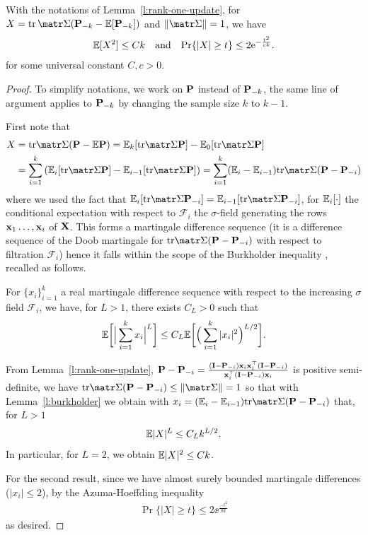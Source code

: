 \documentclass[../../thesis.tex]{subfiles}
\begin{document}
\begin{lemma}\label{l:trace}
  With the notations of Lemma~\ref{l:rank-one-update}, for $X=\tr\,\Sigmab(\P_{-k}-\E[\P_{-k}])$
  and $\|\Sigmab\| = 1$, we have
  \begin{align*}
    \E[X^2]\leq
    Ck\quad\text{and}\quad\Pr\{|X|\geq t\}\leq 2 \ee^{-\frac{t^2}{ck}}.
  \end{align*}
  for some universal constant $C,c > 0$.
\end{lemma}
\begin{proof}
  To simplify notations, we work on $\P$ instead of $\P_{-k}$, the same line of argument applies to $\P_{-k}$ by changing the sample size $k$ to $k-1$.

  First note that
  \begin{align*}
    X
     & = \tr \Sigmab (\P - \E \P)
    = \E_k [\tr \Sigmab \P]  - \E_0[ \tr \Sigmab \P ]                               \\
     & = \sum_{i=1}^k \left( \E_i[\tr \Sigmab \P] - \E_{i-1}[\tr \Sigmab \P]\right)
    = \sum_{i=1}^k (\E_i - \E_{i-1}) \tr \Sigmab (\P - \P_{-i})
  \end{align*}
  where we used the fact that $\E_i [\tr \Sigmab \P_{-i}] = \E_{i-1} [\tr \Sigmab \P_{-i}]$, for $\E_i[\cdot]$ the conditional expectation with respect to $\mathcal F_i$ the $\sigma$-field generating the rows $\x_1 \ldots, \x_i$ of $\X$. This forms a martingale difference sequence (it is a difference sequence of
  the Doob martingale for $\tr \Sigmab (\P - \P_{-i})$ with respect to filtration $\mathcal{F}_i$)
  hence it falls within the scope of the Burkholder inequality \citep{burkholder1973distribution}, recalled as follows.

  \begin{lemma}\label{l:burkholder}
    For $\{ x_i \}_{i=1}^k$ a real martingale difference sequence with respect to the increasing $\sigma$ field $\mathcal F_i$, we have, for $L > 1$, there exists $C_L > 0$ such that
    \[
      \E \bigg[
        \Big| \sum_{i=1}^k x_i \Big|^L
        \bigg]
      \le C_L \E \bigg[
        \Big( \sum_{i=1}^k |x_i|^2 \Big)^{L/2}
        \bigg].
    \]
  \end{lemma}

  From Lemma~\ref{l:rank-one-update}, $\P - \P_{-i} = \frac{(\I - \P_{-i}) \x_i \x_i^\top (\I - \P_{-i}) }{ \x_i^\top (\I - \P_{-i}) \x_i}$ is positive semi-definite, we have $\tr \Sigmab (\P - \P_{-i}) \le \| \Sigmab \| = 1$ so that with Lemma~\ref{l:burkholder} we obtain with $x_i = (\E_i - \E_{i-1}) \tr \Sigmab (\P - \P_{-i})$ that, for $L > 1$
  \[
    \E |X|^L \le C_L k^{L/2}.
  \]
  In particular, for $L=2$, we obtain $\E |X|^2 \le C k$.

  For the second result, since we have almost surely bounded martingale differences
  ($\lvert x_i \rvert \leq 2$), by the Azuma-Hoeffding inequality
  \begin{align*}
    \Pr\{
    \lvert X \rvert
    \geq t
    \}
    \leq 2 \ee^{\frac{-t^2}{8 k}}
  \end{align*}
  as desired.
\end{proof}
\end{document}

